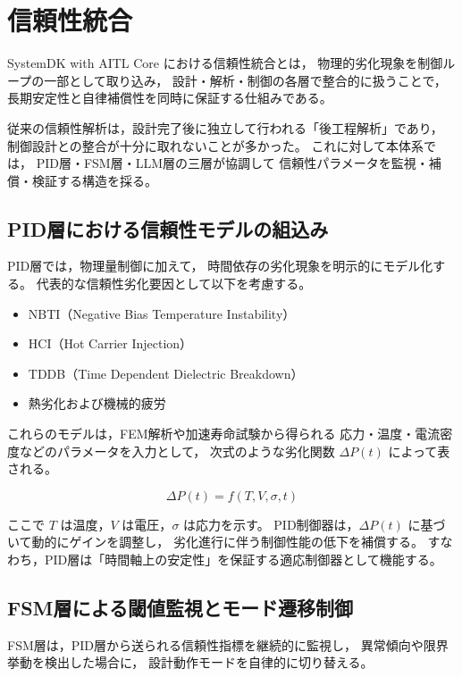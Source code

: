 \section{信頼性統合}

SystemDK with AITL Core における信頼性統合とは，
物理的劣化現象を制御ループの一部として取り込み，
設計・解析・制御の各層で整合的に扱うことで，
長期安定性と自律補償性を同時に保証する仕組みである。

従来の信頼性解析は，設計完了後に独立して行われる「後工程解析」であり，
制御設計との整合が十分に取れないことが多かった。
これに対して本体系では，
PID層・FSM層・LLM層の三層が協調して
信頼性パラメータを監視・補償・検証する構造を採る。

\subsection{PID層における信頼性モデルの組込み}
PID層では，物理量制御に加えて，
時間依存の劣化現象を明示的にモデル化する。
代表的な信頼性劣化要因として以下を考慮する。

\begin{itemize}
  \item NBTI（Negative Bias Temperature Instability）
  \item HCI（Hot Carrier Injection）
  \item TDDB（Time Dependent Dielectric Breakdown）
  \item 熱劣化および機械的疲労
\end{itemize}

これらのモデルは，FEM解析や加速寿命試験から得られる
応力・温度・電流密度などのパラメータを入力として，
次式のような劣化関数 $\Delta P(t)$ によって表される。

\begin{equation}
\Delta P(t) = f(T, V, \sigma, t)
\end{equation}

ここで $T$ は温度，$V$ は電圧，$\sigma$ は応力を示す。
PID制御器は，$\Delta P(t)$ に基づいて動的にゲインを調整し，
劣化進行に伴う制御性能の低下を補償する。
すなわち，PID層は「時間軸上の安定性」を保証する適応制御器として機能する。

\subsection{FSM層による閾値監視とモード遷移制御}
FSM層は，PID層から送られる信頼性指標を継続的に監視し，
異常傾向や限界挙動を検出した場合に，
設計動作モードを自律的に切り替える。

